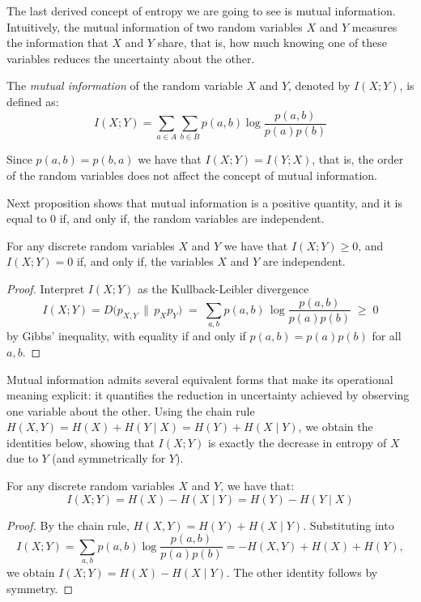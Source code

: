 
The last derived concept of entropy we are going to see is mutual information. Intuitively, the mutual information of two random variables $X$ and $Y$ measures the information that $X$ and $Y$ share, that is, how much knowing one of these variables reduces the uncertainty about the other.

\begin{definition}
The \emph{mutual information} of the random variable $X$ and $Y$, denoted by $I(X ; Y)$, is defined as:
\[
I(X ; Y) = \sum_{a \in A} \sum_{b \in B} p(a, b) \log \frac{p(a, b)}{p(a) p(b)}
\]
\end{definition}

Since $p(a, b) = p(b, a)$ we have that $I(X ; Y) = I(Y ; X)$, that is, the order of the random variables does not affect the concept of mutual information.

Next proposition shows that mutual information is a positive quantity, and it is equal to 0 if, and only if, the random variables are independent.

\begin{proposition}
For any discrete random variables $X$ and $Y$ we have that $I(X ; Y) \geq 0$, and $I(X ; Y) = 0$ if, and only if, the variables $X$ and $Y$ are independent.
\end{proposition}
\begin{proof}
Interpret $I(X;Y)$ as the Kullback-Leibler divergence
\[
I(X;Y)= D\big(p_{X,Y}\,\|\,p_Xp_Y\big)\;=\;\sum_{a,b} p(a,b)\,\log\frac{p(a,b)}{p(a)p(b)}\;\ge\;0
\]
by Gibbs' inequality, with equality if and only if $p(a,b)=p(a)p(b)$ for all $a,b$.
\end{proof}

Mutual information admits several equivalent forms that make its operational meaning explicit: it quantifies the reduction in uncertainty achieved by observing one variable about the other. Using the chain rule $H(X,Y)=H(X)+H(Y\mid X)=H(Y)+H(X\mid Y)$, we obtain the identities below, showing that $I(X;Y)$ is exactly the decrease in entropy of $X$ due to $Y$ (and symmetrically for $Y$).

\begin{proposition}
For any discrete random variables $X$ and $Y$, we have that:
\[
I(X;Y) = H(X) - H(X \mid Y) = H(Y) - H(Y \mid X)
\]
\end{proposition}
\begin{proof}
By the chain rule, $H(X,Y)=H(Y)+H(X\mid Y)$. Substituting into
\[
I(X;Y)=\sum_{a,b} p(a,b)\log\frac{p(a,b)}{p(a)p(b)}
= -H(X,Y)+H(X)+H(Y),
\]
we obtain $I(X;Y)=H(X)-H(X\mid Y)$. The other identity follows by symmetry.
\end{proof}

